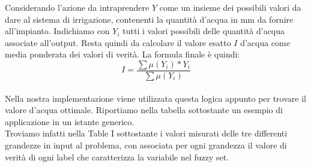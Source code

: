 \documentclass[conference,10pt]{IEEEtran}
\begin{document}
Considerando l'azione da intraprendere $Y$ come un insieme dei possibili valori da dare al sistema di irrigazione, contenenti la quantità d'acqua in mm da fornire all'impianto.
Indichiamo con $Y_i$ tutti i valori possibili delle quantità d'acqua associate all'output. Resta quindi da calcolare il valore esatto $I$ d'acqua come media ponderata dei valori di verità.
La formula finale è quindi:\\
\begin{equation*}
I=\dfrac{\sum \mu(Y_i)*Y_i}{\sum \mu (Y_i)}
\end{equation*} 
\\Nella nostra implementazione viene utilizzata questa logica appunto per trovare il valore d'acqua ottimale. Riportiamo nella tabella sottostante un esempio di applicazione in un istante generico.\\ Troviamo infatti nella Table I sottostante i valori misurati delle tre differenti grandezze in input al problema, con associata per ogni grandezza il valore di verità di ogni label che caratterizza la variabile nel fuzzy set.
\end{document}
